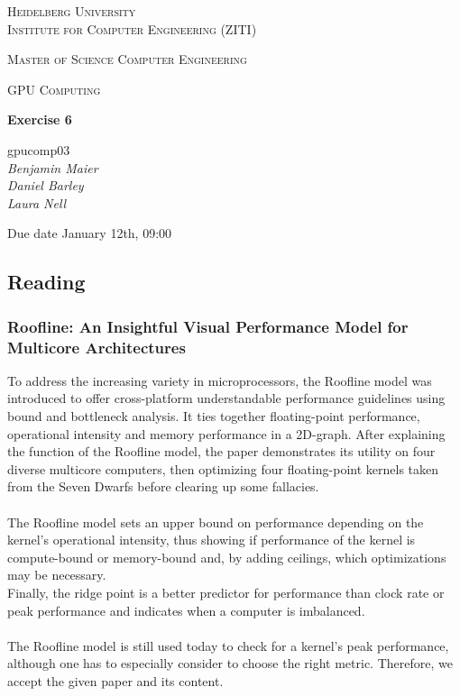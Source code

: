\documentclass[12pt]{article}
\newcommand{\lecture}{GPU Computing}
\newcommand{\exercise}{Exercise 6}
\newcommand{\groupnumber}{gpucomp03}
\newcommand{\groupmemberslist}{Benjamin Maier\\Daniel Barley\\Laura Nell}
\newcommand{\duedate}{January 12th, 09:00}
\begin{document}
	\begin{titlepage}
		\centering

		{\scshape\LARGE Heidelberg University\\Institute for Computer Engineering (ZITI) \par}
		\vspace{1.5cm}
		{\scshape\Large Master of Science Computer Engineering \par}
		\vspace{0.5cm}
		{\scshape\Large \lecture \par}
		\vspace{1.5cm}
		{\huge\bfseries \exercise \par}
		\vspace{2cm}
		{\Large \groupnumber \itshape \\ \vspace{30pt} \groupmemberslist \par}
		\vfill
		
		
		{\large Due date \duedate \par}
	\end{titlepage}

\setcounter{section}{6}

\subsection{Reading}
\subsubsection*{Roofline: An Insightful Visual Performance Model for Multicore Architectures}
To address the increasing variety in microprocessors, the Roofline model was introduced to offer cross-platform understandable performance guidelines using bound and bottleneck analysis. It ties together floating-point performance, operational intensity and memory performance in a 2D-graph. After explaining the function of the Roofline model, the paper demonstrates its utility on four diverse multicore computers, then optimizing four floating-point kernels taken from the Seven Dwarfs before clearing up some fallacies.\\\\
The Roofline model sets an upper bound on performance depending on the kernel's operational intensity, thus showing if performance of the kernel is compute-bound or memory-bound and, by adding ceilings, which optimizations may be necessary.\\
Finally, the ridge point is a better predictor for performance than clock rate or peak performance and indicates when a computer is imbalanced.\\\\
The Roofline model is still used today to check for a kernel's peak performance, although one has to especially consider to choose the right metric. Therefore, we accept the given paper and its content. 
\end{document}
